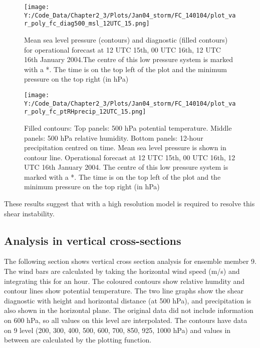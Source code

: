 \begin{figure}
	\texttt{[image: Y:/Code\_Data/Chapter2\_3/Plots/Jan04\_storm/FC\_140104/plot\_var\_poly\_fc\_diag500\_msl\_12UTC\_15.png]}
	\caption{Mean sea level pressure (contours) and diagnostic (filled contours) for operational forecast at 12 UTC 15th, 00 UTC 16th, 12 UTC 16th January 2004.The centre of this low pressure system is marked with a *. The time is on the top left of the plot and the minimum pressure on the top right (in hPa)}\label{fig:fc_diag}
	\centering
\end{figure}

\begin{figure}	%
	\texttt{[image: Y:/Code\_Data/Chapter2\_3/Plots/Jan04\_storm/FC\_140104/plot\_var\_poly\_fc\_ptRHprecip\_12UTC\_15.png]}
	\caption{Filled contours: Top panels: 500 hPa potential temperature. Middle panels: 500 hPa relative humidity. Bottom panels: 12-hour precipitation centred on time. Mean sea level pressure is shown in contour line. Operational forecast at 12 UTC 15th, 00 UTC 16th, 12 UTC 16th January 2004. The centre of this low pressure system is marked with a *. The time is on the top left of the plot and the minimum pressure on the top right (in hPa)}\label{fig:fc_pt_RH_precip}
	\centering
\end{figure}


These results suggest that with a high resolution model is required to resolve this shear instability. 



\subsection{Analysis in vertical cross-sections} \label{cx_analysis}

The following section shows vertical cross section analysis for ensemble member 9. The wind bars are calculated by taking the horizontal wind speed (m/s) and integrating this for an hour. The coloured contours show relative humdity and contour lines show potential temperature. The two line graphs show the shear diagnostic with height and horizontal distance (at 500 hPa), and precipitation is also shown in the horizontal plane. The original data did not include information on 600 hPa, so all values on this level are interpolated. The contours have data on 9 level (200, 300, 400, 500, 600, 700, 850, 925, 1000 hPa) and values in between are calculated by the plotting function.


